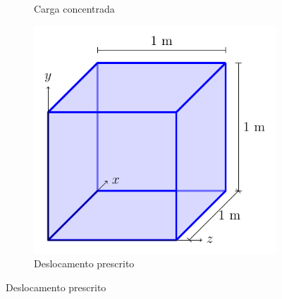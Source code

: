 \begin{figure}
\begin{subfigure}[b]{0.45\textwidth}
        \caption{Carga concentrada}
        \label{fig:verificacao_cubo_4}
    \end{subfigure}
    \begin{subfigure}[b]{0.45\textwidth}
        \centering
        \includegraphics[page=5]{Figuras/verificacao_cubo.pdf}
        \caption{Deslocamento prescrito}
        \label{fig:verificacao_cubo_5}
    \end{subfigure}
\end{figure}
